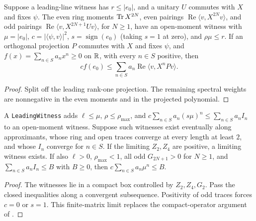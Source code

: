 \begin{lemma}
  \label{lem:leading-polynomial}
  \leanok
  Suppose a leading-line witness has \(r\le|e_0|\), and a unitary \(U\) commutes with \(X\)
  and fixes \(\psi\).
  The even ring moments \(\operatorname{Tr} X^{2N}\), even pairings
  \(\operatorname{Re}\langle v,X^{2N}v\rangle\), and odd pairings
  \(\operatorname{Re}\langle v,X^{2N+1}Uv\rangle\), for \(N\ge1\), have an open-moment
  witness with \(\mu=|e_0|\), \(c=|\langle\psi,v\rangle|^2\),
  \(s=\operatorname{sign}(e_0)\) (taking \(s=1\) at zero), and \(\rho\mu\le r\).
  If an orthogonal projection \(P\) commutes with \(X\) and fixes \(\psi\), and
  \(f(x)=\sum_{n\in S}a_nx^n\ge0\) on \(\mathbb{R}\), with every \(n\in S\) positive, then
  \[
    c f(e_0)\le\sum_{n\in S}a_n\operatorname{Re}\langle v,X^nPv\rangle.
  \]
\end{lemma}
\begin{proof}
  \leanok
  Split off the leading rank-one projection. The remaining spectral weights are nonnegative
  in the even moments and in the projected polynomial.
\end{proof}

\begin{lemma}
  \label{lem:leading-limit}
  \leanok
  A \texttt{LeadingWitness} adds \(\ell\le\mu\), \(\rho\le\rho_{\max}\), and
  \(c\sum_{n\in S}a_n(s\mu)^n\le\sum_{n\in S}a_nI_n\) to an open-moment witness.
  Suppose such witnesses exist eventually along approximants, whose ring and open traces
  converge at every length at least \(2\), and whose \(I_n\) converge for \(n\in S\).
  If the limiting \(Z_2,Z_4\) are positive, a limiting witness exists.
  If also \(\ell>0\), \(\rho_{\max}<1\), all odd \(G_{2N+1}>0\) for \(N\ge1\), and
  \(\sum_{n\in S}a_nI_n\le B\) with \(B\ge0\), then \(c\sum_{n\in S}a_n\mu^n\le B\).
\end{lemma}
\begin{proof}
  \leanok
  The witnesses lie in a compact box controlled by \(Z_2,Z_4,G_2\).
  Pass the closed inequalities along a convergent subsequence.
  Positivity of odd traces forces \(c=0\) or \(s=1\).
  This finite-matrix limit replaces the compact-operator argument of
  \cite[Sections 2--3 and Appendix A]{OpenAIBoundary}.
\end{proof}

